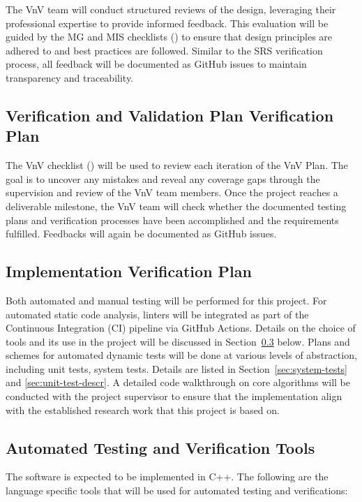 \documentclass[12pt, titlepage]{article}
\begin{document}
The VnV team will conduct structured reviews of the design, leveraging their
professional expertise to provide informed feedback. This evaluation will be
guided by the MG and MIS checklists (\cite{MG_checklist, MIS_checklist}) to ensure
that design principles are adhered to and best practices are followed. Similar
to the SRS verification process, all feedback will be documented as GitHub
issues to maintain transparency and traceability.

\subsection{Verification and Validation Plan Verification Plan}

The VnV checklist (\cite{VnV_checklist}) will be used to review each iteration of
the VnV Plan. The goal is to uncover any mistakes and reveal any coverage gaps
through the supervision and review of the VnV team members. Once the project
reaches a deliverable milestone, the VnV team will check whether the documented
testing plans and verification processes have been accomplished and the
requirements fulfilled. Feedbacks will again be documented as GitHub issues.

\subsection{Implementation Verification Plan}

Both automated and manual testing will be performed for this project. For
automated static code analysis, linters will be integrated as part of the
Continuous Integration (CI) pipeline via GitHub Actions. Details on the choice
of tools and its use in the project will be discussed in
Section~\ref{sec:autom-test-verif} below. Plans and schemes for automated
dynamic tests will be done at various levels of abstraction, including unit
tests, system tests. Details are listed in Section~\ref{sec:system-tests} and
\ref{sec:unit-test-descr}. A detailed code walkthrough on core algorithms will
be conducted with the project supervisor to ensure that the implementation align
with the established research work that this project is based on.

\subsection{Automated Testing and Verification Tools}
\label{sec:autom-test-verif}

The software is expected to be implemented in C++. The following are the
language specific tools that will be used for automated testing and
verifications:
\end{document}
